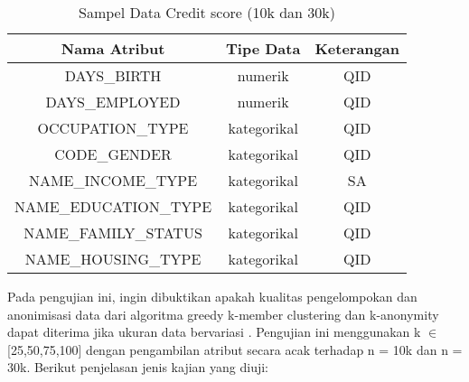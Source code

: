 \begin{table}[h]
\centering
\caption{Sampel Data Credit score (10k dan 30k)}
\vspace{0.2cm}
\begin{tabular}{|c|c|c|}
\hline 
Nama Atribut & Tipe Data & Keterangan\\ 
\hline 
DAYS\_BIRTH & numerik & QID \\ 
\hline 
DAYS\_EMPLOYED & numerik & QID\\ 
\hline 
OCCUPATION\_TYPE & kategorikal & QID\\ 
\hline 
CODE\_GENDER & kategorikal & QID\\ 
\hline 
NAME\_INCOME\_TYPE & kategorikal & SA \\ 
\hline 
NAME\_EDUCATION\_TYPE & kategorikal & QID\\ 
\hline 
NAME\_FAMILY\_STATUS & kategorikal & QID\\ 
\hline 
NAME\_HOUSING\_TYPE & kategorikal & QID\\ 
\hline 
\end{tabular} 
\label{table:ukuran1}
\end{table} 

\vspace{0.5cm}
\begin{minipage}[t]{15.8cm}
Pada pengujian ini, ingin dibuktikan apakah kualitas pengelompokan dan anonimisasi data dari algoritma greedy k-member clustering dan k-anonymity dapat diterima jika ukuran data bervariasi . Pengujian ini menggunakan k $\in$ [25,50,75,100] dengan pengambilan atribut secara acak terhadap n = 10k dan n = 30k. Berikut penjelasan jenis kajian yang diuji:
\end{minipage}

